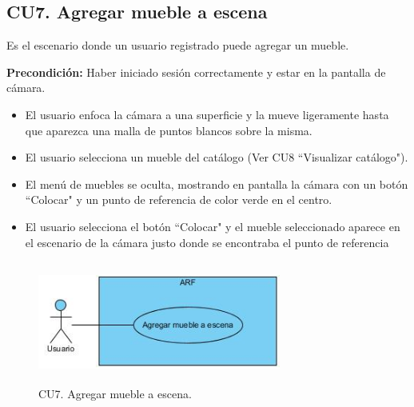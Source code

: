 \subsection{CU7. Agregar mueble a escena}\par
Es el escenario donde un usuario registrado puede agregar un mueble.\par
\textbf{Precondición:} Haber iniciado sesión correctamente y estar en la pantalla de cámara.\par
\begin{itemize}
	\item El usuario enfoca la cámara a una superficie y la mueve ligeramente hasta que aparezca una malla de puntos blancos sobre la misma.
	\item El usuario selecciona un mueble del catálogo (Ver CU8 ``Visualizar catálogo").
	\item El menú de muebles se oculta, mostrando en pantalla la cámara con un botón ``Colocar" y un punto de referencia de color verde en el centro.
	\item El usuario selecciona el botón ``Colocar" y el mueble seleccionado aparece en el escenario de la cámara justo donde se encontraba el punto de referencia
\end{itemize}

\begin{figure}[h!]
	\centering
	\includegraphics[width=8cm,height=4cm]{imagenes/analisis/cu/agregar_mueble.jpg}
	\caption{CU7. Agregar mueble a escena.}
	\label{fig:agregarmueble}
\end{figure} 


